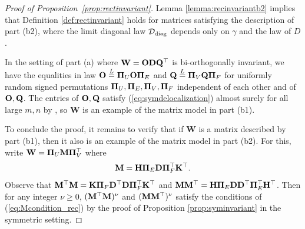 \documentclass[10pt,reqno]{amsart}
\def\bW{{\mathbf{W}}}
\newcommand{\tdiag}{\mathrm{diag}}
\begin{document}
\begin{proof}[Proof of Proposition~\ref{prop:rectinvariant}]
Lemma \ref{lemma:recinvariantb2} implies that 
Definition \ref{def:rectinvariant} holds for matrices satisfying the
description of part (b2), where the limit diagonal law $\cD_{\tdiag}$
depends only on $\gamma$ and the law of $D$.

In the setting of part (a) where $\bW=\bO\bD\bQ^\top$ is bi-orthogonally
invariant, we have the equalities in law $\mathbf{O}\overset{L}{=}\bm{\Pi}_U\mathbf{O}\bm{\Pi}_E$
and $\mathbf{Q}\overset{L}{=}\bm{\Pi}_V\mathbf{Q}\bm{\Pi}_F$ for uniformly
random signed permutations $\bm{\Pi}_U,\bm{\Pi}_E,\bm{\Pi}_V,\bm{\Pi}_F$ independent of each
other and of $\mathbf{O},\mathbf{Q}$. The
entries of $\mathbf{O},\mathbf{Q}$ satisfy (\ref{eq:symdelocalization}) almost
surely for all large $m,n$ by \cite[Theorem 1]{jiang2005maxima}, so $\bW$ is
an example of the matrix model in part (b1).

To conclude the proof,
it remains to verify that if $\bW$ is a matrix described by
part (b1), then it also is an example of the matrix model in part (b2).
For this, write $\bW=\bPi_U\bM \bPi_V^\top$ where
\[\mathbf{M}=\mathbf{H} \bm{\Pi}_E \mathbf{D} \bm{\Pi}_F^\top \mathbf{K}^\top.\]
Observe that $\mathbf{M}^\top \mathbf{M}=\mathbf{K} \bm{\Pi}_F \mathbf{D}^\top\mathbf{D} \bm{\Pi}_F^\top
\mathbf{K}^\top$ and $\mathbf{M}\mathbf{M}^\top=\mathbf{H}\bm{\Pi}_E \mathbf{D}\mathbf{D}^\top \bm{\Pi}_E^\top \mathbf{H}^\top$.
Then for any integer $\nu \geq 0$,
$(\mathbf{M}^\top \mathbf{M})^\nu$ and $(\mathbf{M}\mathbf{M}^\top)^\nu$ satisfy the conditions of
(\ref{eq:Mcondition_rec}) by the proof of Proposition
\ref{prop:syminvariant} in the symmetric setting.


\end{proof}
\end{document}

